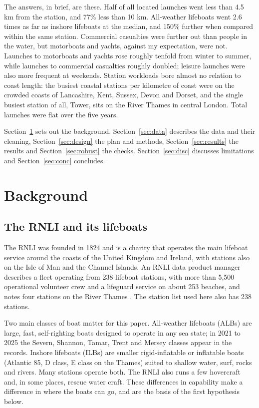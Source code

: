 \documentclass[11pt,a4paper]{article}
\begin{document}
The answers, in brief, are these. Half of all located launches went less than 4.5 km from the station, and 77\% less than 10 km. All-weather lifeboats went 2.6 times as far as inshore lifeboats at the median, and 150\% further when compared within the same station. Commercial casualties were further out than people in the water, but motorboats and yachts, against my expectation, were not. Launches to motorboats and yachts rose roughly tenfold from winter to summer, while launches to commercial casualties roughly doubled; leisure launches were also more frequent at weekends. Station workloads bore almost no relation to coast length: the busiest coastal stations per kilometre of coast were on the crowded coasts of Lancashire, Kent, Sussex, Devon and Dorset, and the single busiest station of all, Tower, sits on the River Thames in central London. Total launches were flat over the five years.

Section~\ref{sec:lit} sets out the background. Section~\ref{sec:data} describes the data and their cleaning, Section~\ref{sec:design} the plan and methods, Section~\ref{sec:results} the results and Section~\ref{sec:robust} the checks. Section~\ref{sec:disc} discusses limitations and Section~\ref{sec:conc} concludes.

\section{Background}\label{sec:lit}
\subsection{The RNLI and its lifeboats}
The RNLI was founded in 1824 and is a charity that operates the main lifeboat service around the coasts of the United Kingdom and Ireland, with stations also on the Isle of Man and the Channel Islands. An RNLI data product manager describes a fleet operating from 238 lifeboat stations, with more than 5,500 operational volunteer crew and a lifeguard service on about 253 beaches, and notes four stations on the River Thames \citep{wright2021}. The station list used here also has 238 stations.

Two main classes of boat matter for this paper. All-weather lifeboats (ALBs) are large, fast, self-righting boats designed to operate in any sea state; in 2021 to 2025 the Severn, Shannon, Tamar, Trent and Mersey classes appear in the records. Inshore lifeboats (ILBs) are smaller rigid-inflatable or inflatable boats (Atlantic 85, D class, E class on the Thames) suited to shallow water, surf, rocks and rivers. Many stations operate both. The RNLI also runs a few hovercraft and, in some places, rescue water craft. These differences in capability make a difference in where the boats can go, and are the basis of the first hypothesis below.
\end{document}
